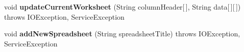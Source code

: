\begin{DoxyCompactItemize}
\item 
\hypertarget{classcom_1_1zeuslearning_1_1automation_1_1io_1_1GoogleSpreadsheet_a7a0ed516dd0f1d7174507205e70325c0}{}\label{classcom_1_1zeuslearning_1_1automation_1_1io_1_1GoogleSpreadsheet_a7a0ed516dd0f1d7174507205e70325c0} 
void {\bfseries update\+Current\+Worksheet} (String column\+Header\mbox{[}$\,$\mbox{]}, String data\mbox{[}$\,$\mbox{]}\mbox{[}$\,$\mbox{]})  throws I\+O\+Exception, Service\+Exception 
\item 
\hypertarget{classcom_1_1zeuslearning_1_1automation_1_1io_1_1GoogleSpreadsheet_aa896ae835b4acf1458abd484d75a533d}{}\label{classcom_1_1zeuslearning_1_1automation_1_1io_1_1GoogleSpreadsheet_aa896ae835b4acf1458abd484d75a533d} 
void {\bfseries add\+New\+Spreadsheet} (String spreadsheet\+Title)  throws I\+O\+Exception, Service\+Exception 
\end{DoxyCompactItemize}
